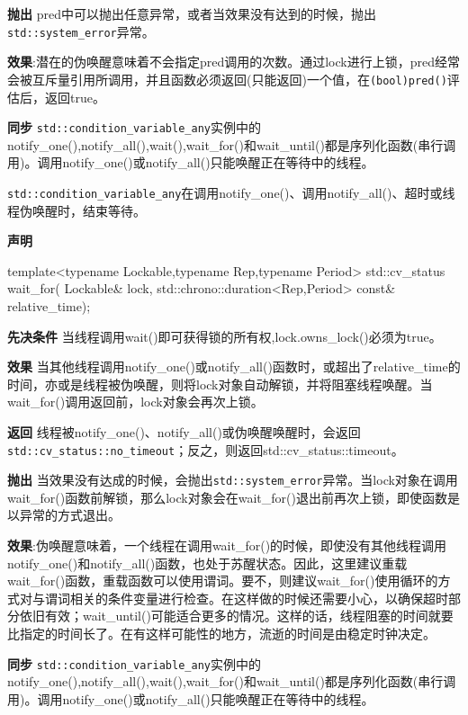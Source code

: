 \textbf{抛出}
pred中可以抛出任意异常，或者当效果没有达到的时候，抛出\texttt{std::system\_error}异常。

\textbf{效果}:潜在的伪唤醒意味着不会指定pred调用的次数。通过lock进行上锁，pred经常会被互斥量引用所调用，并且函数必须返回(只能返回)一个值，在\texttt{(bool)pred()}评估后，返回true。

\textbf{同步}
\texttt{std::condition\_variable\_any}实例中的notify\_one(),notify\_all(),wait(),wait\_for()和wait\_until()都是序列化函数(串行调用)。调用notify\_one()或notify\_all()只能唤醒正在等待中的线程。


\texttt{std::condition\_variable\_any}在调用notify\_one()、调用notify\_all()、超时或线程伪唤醒时，结束等待。

\textbf{声明}

\begin{cpp}
template<typename Lockable,typename Rep,typename Period>
std::cv_status wait_for(
    Lockable& lock,
    std::chrono::duration<Rep,Period> const& relative_time);
\end{cpp}

\textbf{先决条件}
当线程调用wait()即可获得锁的所有权,lock.owns\_lock()必须为true。

\textbf{效果}
当其他线程调用notify\_one()或notify\_all()函数时，或超出了relative\_time的时间，亦或是线程被伪唤醒，则将lock对象自动解锁，并将阻塞线程唤醒。当wait\_for()调用返回前，lock对象会再次上锁。

\textbf{返回}
线程被notify\_one()、notify\_all()或伪唤醒唤醒时，会返回\texttt{std::cv\_status::no\_timeout}；反之，则返回std::cv\_status::timeout。

\textbf{抛出}
当效果没有达成的时候，会抛出\texttt{std::system\_error}异常。当lock对象在调用wait\_for()函数前解锁，那么lock对象会在wait\_for()退出前再次上锁，即使函数是以异常的方式退出。

\textbf{效果}:伪唤醒意味着，一个线程在调用wait\_for()的时候，即使没有其他线程调用notify\_one()和notify\_all()函数，也处于苏醒状态。因此，这里建议重载wait\_for()函数，重载函数可以使用谓词。要不，则建议wait\_for()使用循环的方式对与谓词相关的条件变量进行检查。在这样做的时候还需要小心，以确保超时部分依旧有效；wait\_until()可能适合更多的情况。这样的话，线程阻塞的时间就要比指定的时间长了。在有这样可能性的地方，流逝的时间是由稳定时钟决定。

\textbf{同步}
\texttt{std::condition\_variable\_any}实例中的notify\_one(),notify\_all(),wait(),wait\_for()和wait\_until()都是序列化函数(串行调用)。调用notify\_one()或notify\_all()只能唤醒正在等待中的线程。

